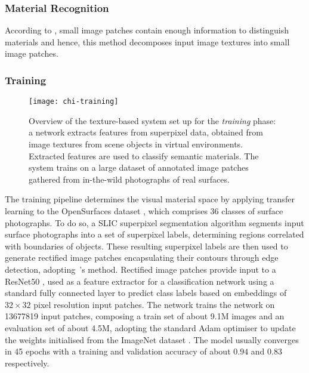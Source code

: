 \subsubsection{Material Recognition}
According to \cite{schwartz2019recognizing}, small image patches contain enough information to distinguish materials and hence, this method decomposes input image textures into small image patches.
\subsubsection{Training}
\begin{figure}[htbp]
    \centering
    \texttt{[image: chi-training]}
    \caption[Texture-based material recognition system --- training phase]{Overview of the texture-based system set up for the \emph{training} phase: a network extracts features from superpixel data, obtained from image textures from scene objects in virtual environments. Extracted features are used to classify semantic materials. The system trains on a large dataset of annotated image patches gathered from in-the-wild photographs of real surfaces.}
    \label{fig:texture-tagging-training}
\end{figure}
The training pipeline determines the visual material space by applying transfer learning to the OpenSurfaces dataset \citep{bell2013opensurfaces}, which comprises 36 classes of surface photographs. To do so, a SLIC superpixel segmentation algorithm \citep{slic6205760} segments input surface photographs into a set of superpixel labels, determining regions correlated with boundaries of objects. These resulting superpixel labels are then used to generate rectified image patches encapsulating their contours through edge detection, adopting~\cite{ding2001canny}'s method.
Rectified image patches provide input to a ResNet50 \citep{he2016deep}, used as a feature extractor for a classification network using a standard fully connected layer to predict class labels based on embeddings of $32\times32$ pixel resolution input patches. The network trains the network on 13677819 input patches, composing a train set of about 9.1M images and an evaluation set of about 4.5M, adopting the standard Adam optimiser \citep{kingma2014adam} to update the weights initialised from the ImageNet dataset \citep{deng2009imagenet}. The model usually converges in 45 epochs with a training and validation accuracy of about $0.94$ and $0.83$ respectively. 

